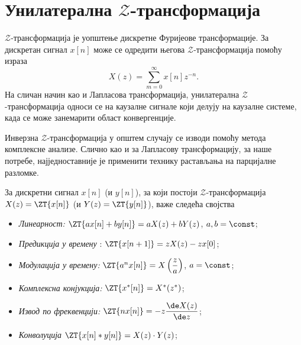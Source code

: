 \section*{Унилатерална $\mathcal{Z}$-трансформација}

$\mathcal{Z}$-трансформација је уопштење дискретне Фуријеове трансформације. За дискретан сигнал $x[n]$ може се одредити
његова $\mathcal{Z}$-трансформација помоћу израза 
\begin{equation}
        X(z) = \sum_{m = 0}^{\infty} x[n] z^{-n}.
\end{equation}
На сличан начин као и Лапласова трансформација, унилатерална $\mathcal{Z}$-трансформација односи се на каузалне сигнале 
који делују на каузалне системе, када се може занемарити област конвергенције.

Инверзна $\mathcal{Z}$-трансформација у општем случају се изводи помоћу метода комплексне анализе. 
Слично као и за Лапласову трансформацију, за наше потребе, најједноставније је 
применити технику растављања на парцијалне разломке.

За дискретни сигнал $x[n]$ (и $y[n]$), за који постоји $\mathcal{Z}$-трансформација
$X(z) = \ZT{x[n]}$ (и $Y(z) = \ZT{y[n]}$), важе следећа својства
\begin{itemize}
    \item \emph{Линеарност:} $\ZT{ax[n] + by[n]} = a X(z) + b Y(z)$, \qquad $a,b = \const$;
    \item \emph{Предикција у времену} : $\ZT{x[n+1]} = z X(z) - z x[0]$;
    \item \emph{Модулација у времену:} $\ZT{ a^n x[n] } = X \left(\dfrac{z}{a}\right)$, \qquad $a = \const$;
    \item \emph{Комплексна конјукција:} $\ZT{ x^{\ast}[n] } = X^{\ast}(z^{\ast})$;
    \item \emph{Извод по фреквенцији:} $\ZT{n x[n]} = -z \dfrac{\de X(z) }{\de z}$;
    \item \emph{Конволуција} $\ZT{x[n]  \ast y[n]} = X(z) \cdot Y(z)$; 
\end{itemize}